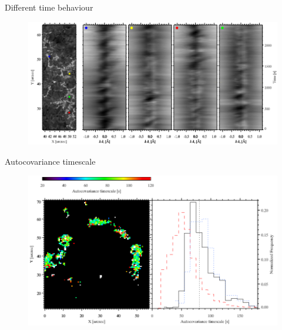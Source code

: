 \documentclass{beamer}
\begin{document}
\begin{frame}{Different time behaviour}
\begin{figure}[H]
 \centering
 \includegraphics[scale=0.4]{im1.png}
\end{figure}

\end{frame}

\begin{frame}{Autocovariance timescale}
\begin{figure}[H]
 \centering
 \includegraphics[scale=0.4]{im2.png}
\end{figure}

\end{frame}
\end{document}
